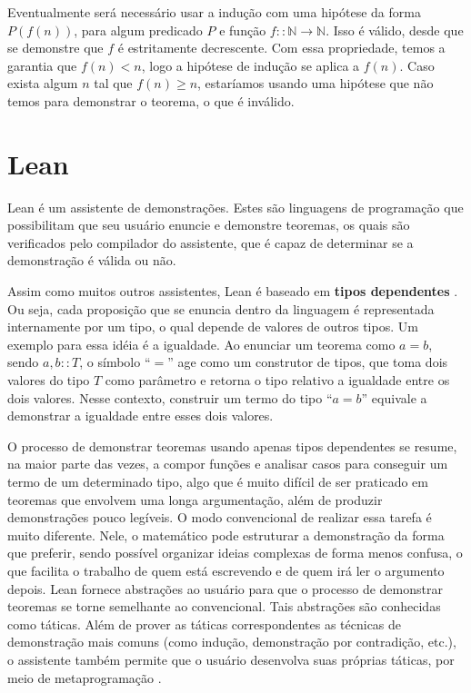 \documentclass[12pt, oneside, a4paper,english,brazil]{abntex2}
\begin{document}
\qquad Eventualmente ser\'a necess\'ario usar a indu\c{c}\~ao com uma hip\'otese da forma $P(f(n))$, para
algum predicado $P$ e fun\c{c}\~ao $f :: \mathbb{N} \rightarrow \mathbb{N}$. Isso \'e v\'alido, desde que se
demonstre que $f$ \'e estritamente decrescente. Com essa propriedade, temos a garantia que $f(n) < n$,
logo a hip\'otese de indu\c{c}\~ao se aplica a $f(n)$. Caso exista algum $n$ tal que $f(n) \geq n$,
estar\'iamos usando uma hip\'otese que n\~ao temos para demonstrar o teorema, o que \'e inv\'alido.

\section{Lean}

\qquad Lean \cite{2} \'e um assistente de demonstra\c{c}\~oes. Estes s\~ao linguagens de programa\c{c}\~ao que
possibilitam que seu usu\'ario enuncie e demonstre teoremas, os quais s\~ao verificados pelo compilador do
assistente, que \'e capaz de determinar se a demonstra\c{c}\~ao \'e v\'alida ou n\~ao.

\qquad Assim como muitos outros assistentes, Lean \'e baseado em \textbf{tipos
  dependentes} \cite{typesAtWork}. Ou seja, cada proposi\c{c}\~ao que se enuncia dentro da linguagem \'e
representada internamente por um tipo, o qual depende de valores de outros tipos. Um exemplo para essa
id\'eia \'e a igualdade. Ao enunciar um teorema como $a = b$, sendo $a, b :: T$, o s\'imbolo ``$=$'' age como
um construtor de tipos, que toma dois valores do tipo $T$ como par\^ametro e retorna o tipo relativo a
igualdade entre os dois valores. Nesse contexto, construir um termo do tipo ``$a = b$'' equivale a demonstrar
a igualdade entre esses dois valores.

\qquad O processo de demonstrar teoremas usando apenas tipos dependentes se resume, na maior parte das vezes, a
compor fun\c{c}\~oes e analisar casos para conseguir um termo de um determinado tipo, algo que \'e muito dif\'icil
de ser praticado em teoremas que envolvem uma longa argumenta\c{c}\~ao, al\'em de produzir demonstra\c{c}\~oes
pouco leg\'iveis. O modo convencional de realizar essa tarefa \'e muito diferente. Nele,
o matem\'atico pode estruturar a demonstra\c{c}\~ao da forma que preferir, sendo poss\'ivel organizar
ideias complexas de forma menos confusa, o que facilita o trabalho de quem est\'a escrevendo e de quem ir\'a
ler o argumento depois.
Lean fornece abstra\c{c}\~oes ao usu\'ario para que o processo de demonstrar teoremas se torne semelhante ao
convencional. Tais abstra\c{c}\~oes s\~ao conhecidas como t\'aticas. Al\'em de prover as t\'aticas
correspondentes as t\'ecnicas de demonstra\c{c}\~ao mais comuns (como indu\c{c}\~ao, demonstra\c{c}\~ao por
contradi\c{c}\~ao, etc.), o assistente tamb\'em permite que o usu\'ario desenvolva suas pr\'oprias t\'aticas, por
meio de metaprograma\c{c}\~ao \cite{metaprog}.
\end{document}
